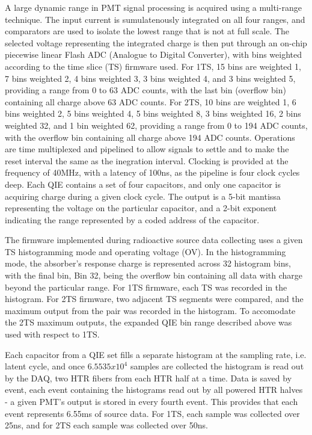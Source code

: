 A large dynamic range in PMT signal processing is acquired using
a multi-range technique. The input current is sumulatenously integrated on all
four ranges, and comparators are used to isolate the lowest range that is not at
full scale. The selected voltage representing the integrated charge is then put
through an on-chip piecewise linear Flash ADC (Analogue to Digital Converter),
with bins weighted according to the time slice (TS) firmware used. For 1TS, 15
bins are weighted 1, 7 bins weighted 2, 4 bins weighted 3, 3 bins weighted 4,
and 3 bins weighted 5, providing a range from 0 to 63 ADC counts, with the last
bin (overflow bin) containing all charge above 63 ADC counts. For 2TS, 10 bins
are weighted 1, 6 bins weighted 2, 5 bins weighted 4, 5 bins weighted 8, 3 bins
weighted 16, 2 bins weighted 32, and 1 bin weighted 62, providing a range from
0 to 194 ADC counts, with the overflow bin containing all charge above 194 ADC
counts. Operations are time multiplexed and pipelined to allow signals to
settle and to make the reset interval the same as the inegration interval.
Clocking is provided at the frequency of 40\unit{MHz}, with a latency of
100\unit{ns}, as the pipeline is four clock cycles deep. Each QIE contains a
set of four capacitors, and only one capacitor is acquiring charge during a
given clock cycle. The output is a 5-bit mantissa representing the voltage on
the particular capacitor, and a 2-bit exponent indicating the range
represented by a coded address of the capacitor.

The firmware implemented during radioactive source data collecting uses a
given TS histogramming mode and operating voltage (OV). In the histogramming
mode, the absorber's response charge is represented across 32 histogram bins,
with the final bin, Bin 32, being the overflow bin containing all data with
charge beyond the particular range. For 1TS firmware, each TS was recorded in
the histogram. For 2TS firmware, two adjacent TS segments were compared, and
the maximum output from the pair was recorded in the histogram. To accomodate
the 2TS maximum outputs, the expanded QIE bin range described above was used
with respect to 1TS.

Each capacitor from a QIE set fills a separate histogram at the sampling rate,
i.e. latent cycle, and once $6.5535 x 10^4$ samples are collected the histogram
is read out by the DAQ, two HTR fibers from each HTR half at a time. Data is
saved by event, each event containing the histograms read out by all powered HTR
halves - a given PMT's output is stored in every fourth event. This provides
that each event represents 6.55\unit{ms} of source data. For 1TS, each sample
was collected over 25\unit{ns}, and for 2TS each sample was collected over
50\unit{ns}.